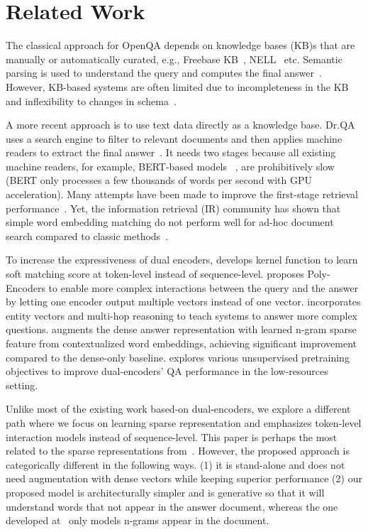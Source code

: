 \documentclass[11pt,a4paper]{article}
\begin{document}
\section{Related Work}
The classical approach for OpenQA depends on knowledge bases (KB)s that are manually or automatically curated, e.g., Freebase KB~\cite{bollacker2008freebase}, NELL~\cite{fader2014open} etc. Semantic parsing is used to understand the query and computes the final answer~\cite{berant2013semantic,berant2014semantic}. However, KB-based systems are often limited due to incompleteness in the KB and inflexibility to changes in schema~\cite{ferrucci2010building}. 

A more recent approach is to use text data directly as a knowledge base. Dr.QA uses a search engine to filter to relevant documents and then applies machine readers to extract the final answer~\cite{chen2017reading}. It needs two stages because all existing machine readers, for example, BERT-based models ~\cite{devlin2018bert}, are prohibitively slow (BERT only processes a few thousands of words per second with GPU acceleration). Many attempts have been made to improve the first-stage retrieval performance~\cite{chidambaram2018learning,seo2019real,henderson2019convert,karpukhin2020dense,chang2020pre}. Yet, the information retrieval (IR) community has shown that simple word embedding matching do not perform well for ad-hoc document search compared to classic methods~\cite{guo2016deep,xiong2017end}. 

To increase the expressiveness of dual encoders, \citet{xiong2017end} develops kernel function to learn soft matching score at token-level instead of sequence-level. \citet{humeau2019poly} proposes Poly-Encoders to enable more complex interactions between the query and the answer by letting one encoder output multiple vectors instead of one vector. \citet{dhingra2020differentiable} incorporates entity vectors and multi-hop reasoning to teach systems to answer more complex questions. \cite{Lee2020ContextualizedSR} augments the dense answer representation with learned n-gram sparse feature from contextualized word embeddings, achieving significant improvement compared to the dense-only baseline. \citet{chang2020pre} explores various unsupervised pretraining objectives to improve dual-encoders' QA performance in the low-resources setting.



Unlike most of the existing work based-on dual-encoders, we explore a different path where we focus on learning sparse representation and emphasizes token-level interaction models instead of sequence-level. This paper is perhaps the most related to the sparse representations from~\cite{Lee2020ContextualizedSR}. However, the proposed approach is categorically different in the following ways. (1) it is stand-alone and does not need augmentation with dense vectors while keeping superior performance (2) our proposed model is architecturally simpler and is generative so that it will understand words that not appear in the answer document, whereas the one developed at~\cite{Lee2020ContextualizedSR} only models n-grams appear in the document.
\end{document}
